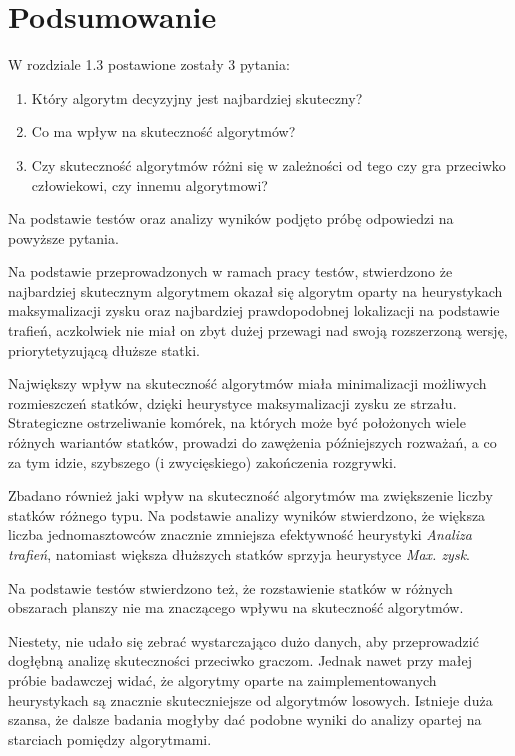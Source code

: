 \newpage %
\section{Podsumowanie}

W rozdziale 1.3 postawione zostały 3 pytania:

\begin{enumerate}
    \item Który algorytm decyzyjny jest najbardziej skuteczny?
    \item Co ma wpływ na skuteczność algorytmów?
    \item Czy skuteczność algorytmów różni się w zależności od tego czy gra przeciwko człowiekowi, czy innemu algorytmowi?
\end{enumerate}

Na podstawie testów oraz analizy wyników podjęto próbę odpowiedzi na powyższe pytania.

Na podstawie przeprowadzonych w ramach pracy testów, stwierdzono że najbardziej skutecznym algorytmem okazał się algorytm oparty na heurystykach maksymalizacji zysku oraz najbardziej prawdopodobnej lokalizacji na podstawie trafień, aczkolwiek nie miał on zbyt dużej przewagi nad swoją rozszerzoną wersję, priorytetyzującą dłuższe statki.

Największy wpływ na skuteczność algorytmów miała minimalizacji możliwych rozmieszczeń statków, dzięki heurystyce maksymalizacji zysku ze strzału. Strategiczne ostrzeliwanie komórek, na których może być położonych wiele różnych wariantów statków, prowadzi do zawężenia późniejszych rozważań, a co za tym idzie, szybszego (i zwycięskiego) zakończenia rozgrywki.

Zbadano również jaki wpływ na skuteczność algorytmów ma zwiększenie liczby statków różnego typu. Na podstawie analizy wyników stwierdzono, że większa liczba jednomasztowców znacznie zmniejsza efektywność heurystyki \emph{Analiza trafień}, natomiast większa dłuższych statków sprzyja heurystyce \emph{Max. zysk}.

Na podstawie testów stwierdzono też, że rozstawienie statków w różnych obszarach planszy nie ma znaczącego wpływu na skuteczność algorytmów.

Niestety, nie udało się zebrać wystarczająco dużo danych, aby przeprowadzić dogłębną analizę skuteczności przeciwko graczom. Jednak nawet przy małej próbie badawczej widać, że algorytmy oparte na zaimplementowanych heurystykach są znacznie skuteczniejsze od algorytmów losowych. Istnieje duża szansa, że dalsze badania mogłyby dać podobne wyniki do analizy opartej na starciach pomiędzy algorytmami.

